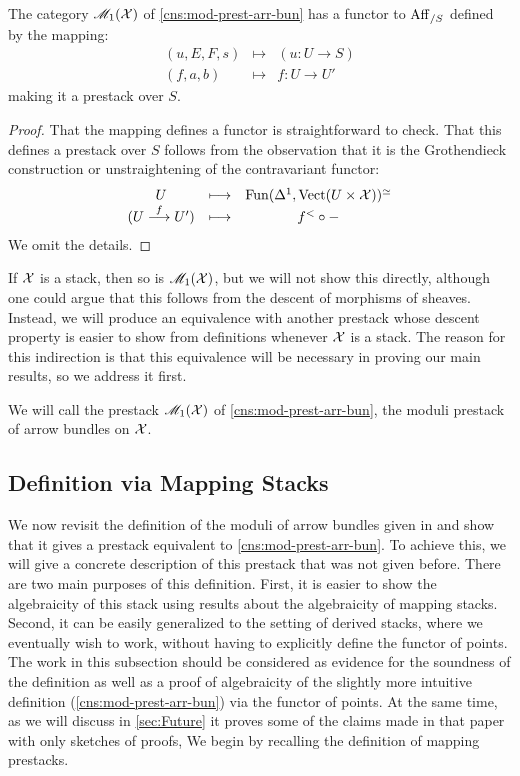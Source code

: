 \documentclass[11pt]{amsart}
\begin{document}
\begin{prop}
The category $\mathscr{M}_1(\mathcal{X})$ of \cref{cns:mod-prest-arr-bun} has a functor
to $\mathrm{Aff}_{/S}$ defined by the mapping:
\[\begin{array}{ccc}
(u, E, F, s) &\mapsto& (u : U \to S) \\
(f, a, b) &\mapsto& f : U \to U'
\end{array}\]
making it a prestack over $S$.
\end{prop}
\begin{proof}
That the mapping defines a functor is straightforward to check. That
this defines a prestack over $S$ follows from the observation that it
is the Grothendieck construction or unstraightening of the contravariant
functor:
\[\begin{array}{ccc}
U &\mapsto& \Fun(\Delta^1, \Vect(U \times \mcX))^\simeq \\
(U \to[f] U') &\mapsto& f^< \circ -
\end{array}\]
We omit the details.
\end{proof}

\begin{rmk}
If $\mathcal{X}$ is a stack, then so is $\mathscr{M}_1(\mathcal{X})$, but we will not show this
directly, although one could argue that this follows from the descent of
morphisms of sheaves.
Instead, we will produce an equivalence with another prestack
whose descent property is easier to show from definitions whenever $\mathcal{X}$ is
a stack. The reason for this
indirection is that this equivalence will be necessary in proving our
main results, so we address it first.
\end{rmk}

\begin{defn}
We will call the prestack $\mathscr{M}_1(\mathcal{X})$ of \cref{cns:mod-prest-arr-bun},
the moduli prestack of arrow bundles on $\mathcal{X}$.
\end{defn}

\subsection{Definition via Mapping Stacks}

We now revisit the definition of the moduli of arrow bundles given in
\cite{ModQuivBun} and show that it gives a prestack equivalent to
\cref{cns:mod-prest-arr-bun}. To achieve this, we will give a concrete
description of this prestack that was not given before. There are two
main purposes of this definition. First, it is easier to show the algebraicity
of this stack using results about the algebraicity of mapping stacks. Second,
it can be easily generalized to the setting
of derived stacks, where we eventually wish to work,
without having to explicitly define the functor of points.
The work in this subsection should be considered as evidence for the soundness
of the definition as well as a proof of algebraicity of the slightly more
intuitive definition (\cref{cns:mod-prest-arr-bun}) via the functor of points.
At the same time, as we will discuss in \cref{sec:Future}
it proves some of the claims made in that paper with only sketches of proofs,
We begin by recalling the definition of mapping prestacks.
\end{document}
